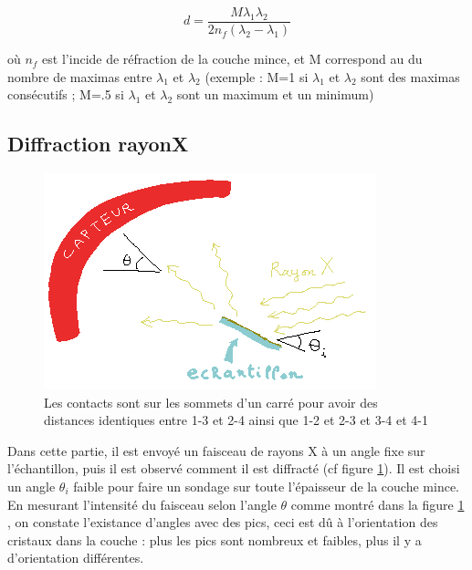 \documentclass[a4paper,12pt,oneside]{article}
\def \be {\begin{equation}}
\def \ee {\end{equation}}
\begin{document}
\be
	d=\frac{M\lambda_1 \lambda_2}{2 n_f (\lambda_2 - \lambda_1)} \label{eq:refl}
\ee


où $n_f$ est l'incide de réfraction de la couche mince, et M correspond au du nombre de maximas entre $\lambda_1$ et $\lambda_2$ (exemple : M=1 si $\lambda_1$ et $\lambda_2$ sont des maximas consécutifs ; M=.5 si $\lambda_1$ et $\lambda_2$ sont un maximum et un minimum)





\subsection{Diffraction rayonX}

		\begin{figure}[h!]
			\begin{center}
			\includegraphics[width=0.8\linewidth,angle=0]{./figures/illustration_rayon_X.png}
			\caption{Les contacts sont sur les sommets d'un carré pour avoir des distances identiques entre 1-3 et 2-4 ainsi que 1-2 et 2-3 et 3-4 et 4-1} \label{fig:illustration_rayon_X}
			\end{center}
		\end{figure}

Dans cette partie, il est envoyé un faisceau de rayons X à un angle fixe sur l'échantillon, puis il est observé comment il est diffracté (cf figure \ref{fig:illustration_rayon_X}). Il est choisi un angle $\theta_i$ faible pour faire un sondage sur toute l'épaisseur de la couche mince. En mesurant l'intensité du faisceau selon l'angle $\theta$ comme montré dans la figure \ref{fig:illustration_rayon_X} , on constate l'existance d'angles avec des pics, ceci est dû à l'orientation des cristaux dans la couche : plus les pics sont nombreux et faibles, plus il y a d'orientation différentes.
\end{document}
